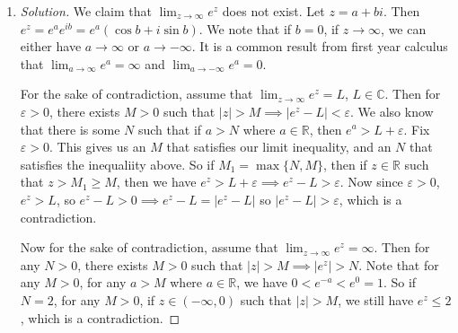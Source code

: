 \documentclass{article}
\newcommand{\R}{{\mathbb R}}
\newcommand{\C}{{\mathbb C}}
\newcommand{\ep}{{\varepsilon}}
\begin{document}
\begin{enumerate}
\begin{proof}[Solution]
\begin{align*}
				&= \infty \cdot (8 + \frac{5}{\infty} + \frac{2}{\infty}))\\
				&= \infty \cdot (8 + 0 + 0)\\
				&= \infty
			\end{align*}
		\end{proof}
	\item \begin{proof}[Solution]\let\qed\relax
			We claim that $\lim_{z\to\infty} e^z$ does not exist.
			Let $z = a + bi$.
			Then $e^z = e^ae^{ib} = e^a(\cos{b} + i\sin{b})$.
			We note that if $b = 0$,
			if $z \to \infty$, we can either have $a \to \infty$ or $a\to - \infty$.
			It is a common result from first year calculus
			that $\lim_{a \to \infty}e^a = \infty$ and $\lim_{a \to -\infty}e^a = 0$.
			
			For the sake of contradiction, assume that
			$\lim_{z\to\infty} e^z = L$, $L \in \C$.
			Then for $\ep > 0$, there exists $M > 0$
			such that $|z| > M \implies |e^z - L| < \ep$.
			We also know that there is some $N$ such that if $a > N$ where $a \in \R$,
			then $e^a > L + \ep$.
			Fix $\ep > 0$. This gives us an $M$ that satisfies our limit inequality,
			and an $N$ that satisfies the inequaliity above.
			So if $M_1 = \max\{N,M\}$,
			then if $z \in \R$ such that $z > M_1\geq M$, then we have
			$e^z > L + \ep \implies e^z - L > \ep$.
			Now since $\ep > 0$, $e^z > L$, so $e^z - L > 0 \implies
			e^z - L = |e^z - L|$
			so $|e^z - L| > \ep$, which is a contradiction.

			Now for the sake of contradiction, assume that
			$\lim_{z\to\infty} e^z = \infty$.
			Then for any $N > 0$, there exists $M > 0$ such that
			$|z| > M \implies |e^z| > N$.
			Note that for any $M > 0$, for any $a > M$ where $a \in \R$,
			we have $0 < e^{-a} < e^{0} = 1$.
			So if $N = 2$, 
			for any $M > 0$, if $z \in (-\infty,0)$ such that $|z| > M$,
			we still have $e^z \leq 2$, which is a contradiction.
		\end{proof}
\end{enumerate}
\end{document}

